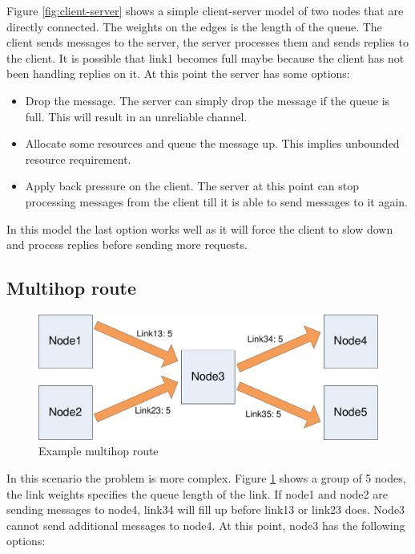 \documentclass[a4paper,twoside]{report} %
\begin{document}
Figure \ref{fig:client-server} shows a simple client-server model
of two nodes that are directly connected.
The weights on the edges is the length of the queue.
The client sends messages to the server, the server processes them
and sends replies to the client.
It is possible that link1 becomes full maybe because
the client has not been handling replies on it.
At this point the server has some options:%

\begin{itemize}
\item Drop the message.
  The server can simply drop the message if the queue is full.
  This will result in an unreliable channel.
\item Allocate some resources and queue the message up.
  This implies unbounded resource requirement.
\item Apply back pressure on the client.
  The server at this point can stop processing messages
  from the client till it is able to send messages to it again.
\end{itemize}

In this model the last option works well as it will force the client
to slow down and process replies before sending more requests.

\subsection{Multihop route}

\begin{figure}[t]
 \includegraphics[width=\columnwidth]{many-to-many.pdf}
 \caption{Example multihop route}\label{fig:many-to-many}
\end{figure}

In this scenario the problem is more complex.
Figure \ref{fig:many-to-many} shows a group of 5 nodes,
the link weights specifies the queue length of the link.
If node1 and node2 are sending messages to node4,
link34 will fill up before link13 or link23 does.
Node3 cannot send additional messages to node4.
At this point, node3 has the following options:
\end{document}

